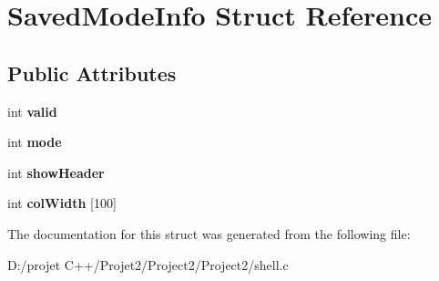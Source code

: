 \hypertarget{struct_saved_mode_info}{}\section{Saved\+Mode\+Info Struct Reference}
\label{struct_saved_mode_info}
\subsection*{Public Attributes}
\begin{DoxyCompactItemize}
\item 
\mbox{\label{struct_saved_mode_info_a43e863fb285c2aad913087572ebd5e27}} 
int {\bfseries valid}
\item 
\mbox{\label{struct_saved_mode_info_ab6d30b28565d51ca017904f70b5edac6}} 
int {\bfseries mode}
\item 
\mbox{\label{struct_saved_mode_info_a73fa5b451f94fa75fb5e27887831b8f4}} 
int {\bfseries show\+Header}
\item 
\mbox{\label{struct_saved_mode_info_add96e86a9293b5e1bfd3ab92bf1a365f}} 
int {\bfseries col\+Width} \mbox{[}100\mbox{]}
\end{DoxyCompactItemize}


The documentation for this struct was generated from the following file\+:\begin{DoxyCompactItemize}
\item 
D\+:/projet C++/\+Projet2/\+Project2/\+Project2/shell.\+c\end{DoxyCompactItemize}
